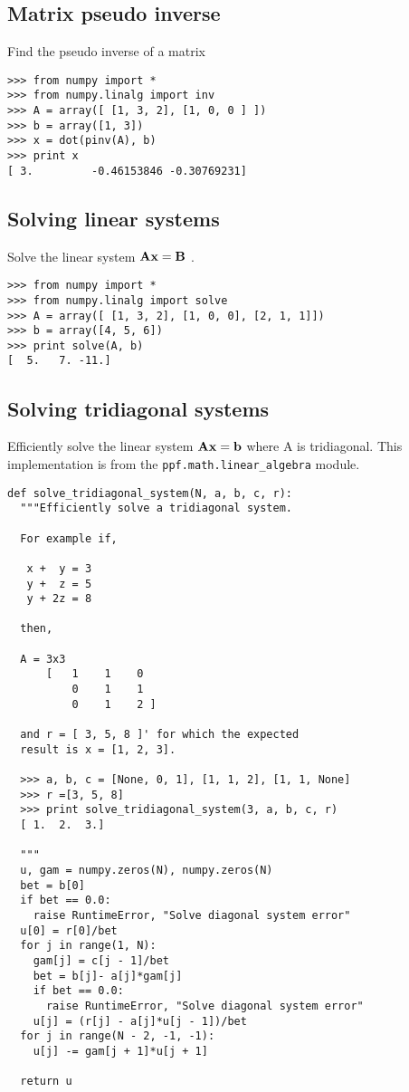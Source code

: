 \subsection{Matrix pseudo inverse}
Find the pseudo inverse of a matrix
\begin{verbatim}
>>> from numpy import *
>>> from numpy.linalg import inv
>>> A = array([ [1, 3, 2], [1, 0, 0 ] ])
>>> b = array([1, 3])
>>> x = dot(pinv(A), b)
>>> print x
[ 3.         -0.46153846 -0.30769231]
\end{verbatim}

\subsection{Solving linear systems}
Solve the linear system $\bf{A}\bf{x} = \bf{B}$ .
\begin{verbatim}
>>> from numpy import *
>>> from numpy.linalg import solve
>>> A = array([ [1, 3, 2], [1, 0, 0], [2, 1, 1]]) 
>>> b = array([4, 5, 6])
>>> print solve(A, b)
[  5.   7. -11.]
\end{verbatim}

\subsection{Solving tridiagonal systems}
Efficiently solve the linear system $\bf{A}\bf{x} = \bf{b}$ where A is
tridiagonal. This implementation is from the
\verb|ppf.math.linear_algebra| module.
\begin{verbatim}
def solve_tridiagonal_system(N, a, b, c, r):
  """Efficiently solve a tridiagonal system.

  For example if,
  
   x +  y = 3
   y +  z = 5
   y + 2z = 8

  then, 

  A = 3x3
      [   1    1    0   
          0    1    1
          0    1    2 ]

  and r = [ 3, 5, 8 ]' for which the expected
  result is x = [1, 2, 3].

  >>> a, b, c = [None, 0, 1], [1, 1, 2], [1, 1, None]
  >>> r =[3, 5, 8]
  >>> print solve_tridiagonal_system(3, a, b, c, r)
  [ 1.  2.  3.]
  
  """
  u, gam = numpy.zeros(N), numpy.zeros(N)
  bet = b[0]
  if bet == 0.0:
    raise RuntimeError, "Solve diagonal system error"
  u[0] = r[0]/bet
  for j in range(1, N):
    gam[j] = c[j - 1]/bet
    bet = b[j]- a[j]*gam[j]
    if bet == 0.0:
      raise RuntimeError, "Solve diagonal system error"
    u[j] = (r[j] - a[j]*u[j - 1])/bet
  for j in range(N - 2, -1, -1):
    u[j] -= gam[j + 1]*u[j + 1]

  return u
\end{verbatim}

